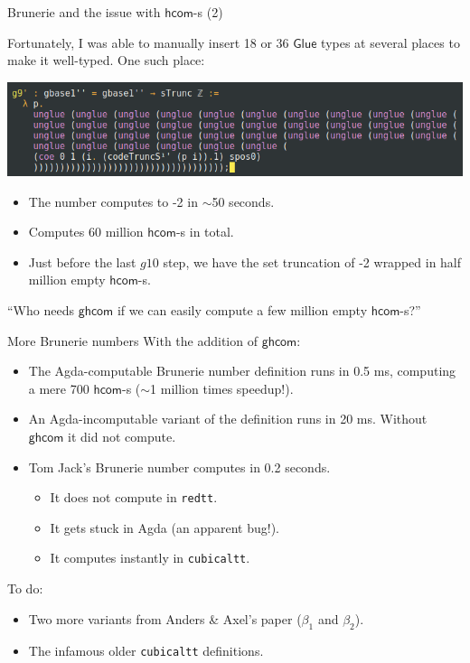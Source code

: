 \documentclass[dvipsnames]{beamer}
\newcommand{\ms}[1]{\mathsf{#1}}
\newcommand{\hcom}{\ms{hcom}}
\newcommand{\Glue}{\ms{Glue}}
\newcommand{\ghcom}{\ms{ghcom}}
\begin{document}
\begin{frame}{Brunerie and the issue with $\hcom$-s (2)}

Fortunately, I was able to manually insert 18 or 36 $\Glue$ types
at several places to make it well-typed. One such place:
\vspace{0.5em}

\includegraphics[scale=0.45]{unglues}
\pause

\begin{itemize}
  \item The number computes to -2 in $\sim$50 seconds.
  \item Computes 60 million $\hcom$-s in total.
  \item Just before the last $g10$ step, we have the set truncation of -2 wrapped
        in half million empty $\hcom$-s.
\end{itemize}
\hspace{0.5em}
\pause

``Who needs $\ghcom$ if we can easily compute a few million empty $\hcom$-s?''

\end{frame}

\begin{frame}{More Brunerie numbers}
With the addition of $\ghcom$:
\begin{itemize}
\item The Agda-computable Brunerie number definition runs in 0.5 ms, computing a
      mere 700 $\hcom$-s ($\sim$1 million times speedup!).
\pause
\item An Agda-incomputable variant of the definition runs in 20 ms. Without $\ghcom$
      it did not compute.
\pause
\item Tom Jack's Brunerie number computes in 0.2 seconds.
     \begin{itemize}
       \item It does not compute in \texttt{redtt}.
       \item It gets stuck in Agda (an apparent bug!).
       \item It computes instantly in \texttt{cubicaltt}.
     \end{itemize}
\end{itemize}
\pause

To do:
\begin{itemize}
  \item Two more variants from Anders \& Axel's paper ($\beta_1$ and $\beta_2$).
  \item The infamous older \texttt{cubicaltt} definitions.
\end{itemize}

\end{frame}
\end{document}
